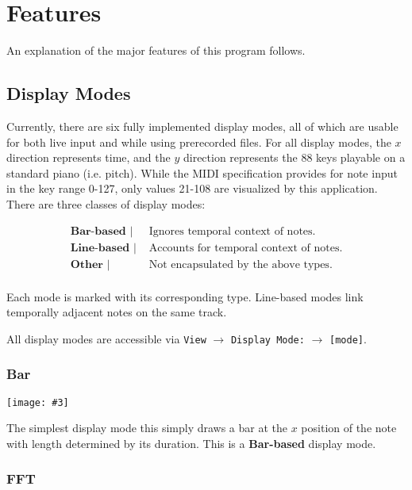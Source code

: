 \documentclass[english]{article}
\makeatletter
\newenvironment{restoretext}%
    {\@parboxrestore%
     \begin{adjustwidth}{}{\leftmargin}%
    }{\end{adjustwidth}
     }
\def\rcbegin{\begin{restoretext}\centering}
\def\rcend{\end{restoretext}}
\newcommand{\rcgnc}[3][]{
  \rcbegin
    \texttt{[image: \#3]}
  \rcend
  \vspace{1em}
}
\providecommand{\mi}[1]{\texttt{#1}}
\makeatother
\begin{document}
\section{Features}

An explanation of the major features of this program follows.

\subsection{Display Modes}

Currently, there are six fully implemented display modes, all of which are usable for both live input and
while using prerecorded files. For all display modes, the $x$ direction represents time, and the $y$ direction
represents the 88 keys playable on a standard piano (i.e. pitch). While the MIDI specification provides for note 
input in the key range
0-127, only values 21-108 are visualized by this application. There are three classes of display modes:

\rcbegin
\begin{align*}
  \textbf{Bar-based }  | & \text{ Ignores temporal context of notes.}\\
  \textbf{Line-based } | & \text{ Accounts for temporal context of notes.}\\
  \textbf{Other }      | & \text{ Not encapsulated by the above types.}\\
\end{align*}
\rcend

Each mode is marked with its corresponding type. Line-based modes link temporally adjacent notes on the same track.

All display modes are accessible via 
\mi{View} $\rightarrow$ \mi{Display Mode:} $\rightarrow$ \mi{[mode]}.

\newpage

\subsubsection{Bar}

\rcgnc{0.86}{image/bar.png}

The simplest display mode \textendash{} this simply draws a bar at the $x$ position of the note with length
determined by its duration.
This is a \textbf{Bar-based} display mode.

\subsubsection{FFT}
\end{document}
